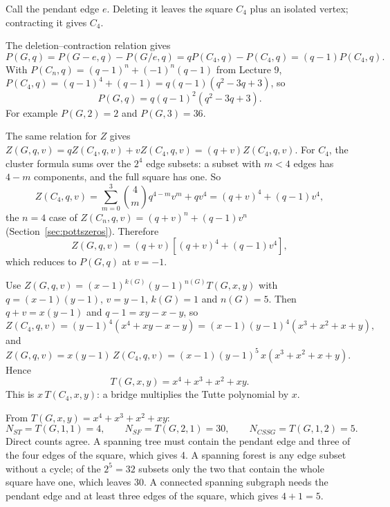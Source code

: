 Call the pendant edge $e$. Deleting it leaves the square $C_4$ plus an isolated vertex; contracting it gives $C_4$.

 The deletion--contraction relation gives
\begin{equation}
  P(G,q) = P(G-e,q)-P(G/e,q) = qP(C_4,q)-P(C_4,q) = (q-1)P(C_4,q).
\end{equation}
With $P(C_n,q) = (q-1)^n+(-1)^n(q-1)$ from Lecture 9, $P(C_4,q) = (q-1)^4+(q-1) = q(q-1)(q^2-3q+3)$, so
\begin{equation}
  P(G,q) = q(q-1)^2(q^2-3q+3).
\end{equation}
For example $P(G,2) = 2$ and $P(G,3) = 36$.

 The same relation for $Z$ gives $Z(G,q,v) = qZ(C_4,q,v)+vZ(C_4,q,v) = (q+v)Z(C_4,q,v)$. For $C_4$, the
cluster formula sums over the $2^4$ edge subsets: a subset with $m<4$ edges has $4-m$ components, and the full square
has one. So
\begin{equation}
  Z(C_4,q,v) = \sum_{m=0}^{3}\binom4m q^{4-m}v^m+qv^4 = (q+v)^4+(q-1)v^4 ,
\end{equation}
the $n = 4$ case of $Z(C_n,q,v) = (q+v)^n+(q-1)v^n$ (Section~\ref{sec:pottszeros}). Therefore
\begin{equation}
  Z(G,q,v) = (q+v)\left[(q+v)^4+(q-1)v^4\right],
\end{equation}
which reduces to $P(G,q)$ at $v = -1$.

 Use $Z(G,q,v) = (x-1)^{k(G)}(y-1)^{n(G)}T(G,x,y)$ with $q = (x-1)(y-1)$, $v = y-1$, $k(G) = 1$ and
$n(G) = 5$. Then $q+v = x(y-1)$ and $q-1 = xy-x-y$, so
\begin{equation}
  Z(C_4,q,v) = (y-1)^4\left(x^4+xy-x-y\right) = (x-1)(y-1)^4\left(x^3+x^2+x+y\right),
\end{equation}
and $Z(G,q,v) = x(y-1)\,Z(C_4,q,v) = (x-1)(y-1)^5\,x\left(x^3+x^2+x+y\right)$. Hence
\begin{equation}
  T(G,x,y) = x^4+x^3+x^2+xy .
\end{equation}
This is $x\,T(C_4,x,y)$: a bridge multiplies the Tutte polynomial by $x$.

From $T(G,x,y) = x^4+x^3+x^2+xy$:
\begin{equation}
  N_{ST} = T(G,1,1) = 4,\qquad N_{SF} = T(G,2,1) = 30,\qquad N_{CSSG} = T(G,1,2) = 5 .
\end{equation}
Direct counts agree. A spanning tree must contain the pendant edge and three of the four edges of the square, which
gives 4. A spanning forest is any edge subset without a cycle; of the $2^5 = 32$ subsets only the two that contain the
whole square have one, which leaves 30. A connected spanning subgraph needs the pendant edge and at least three edges of
the square, which gives $4+1 = 5$.

